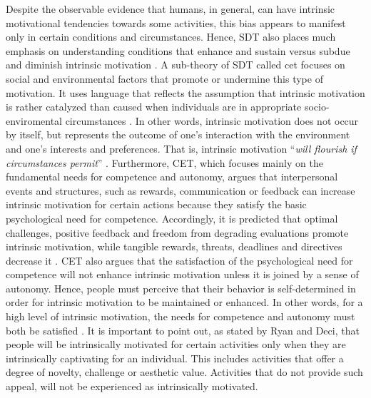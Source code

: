 Despite the observable evidence that humans, in general, can have intrinsic motivational tendencies towards some activities, this bias appears to manifest only in certain conditions and circumstances. Hence, SDT also places much emphasis on understanding conditions that enhance and sustain versus subdue and diminish intrinsic motivation \cite{ryan2000intrinsic}. A sub-theory of SDT called \acrfull{cet} focuses on social and environmental factors that promote or undermine this type of motivation. It uses language that reflects the assumption that intrinsic motivation is rather catalyzed than caused when individuals are in appropriate socio-enviromental circumstances \cite{ryan2000intrinsic, ryan2000self}. In other words, intrinsic motivation does not occur by itself, but represents the outcome of one's interaction with the environment and one's interests and preferences. That is, intrinsic motivation ``\textit{will flourish if circumstances permit}'' \cite{ryan2000self}. Furthermore, CET, which focuses mainly on the fundamental needs for competence and autonomy, argues that interpersonal events and structures, such as rewards, communication or feedback can increase intrinsic motivation for certain actions because they satisfy the basic psychological need for competence. Accordingly, it is predicted that optimal challenges, positive feedback and freedom from degrading evaluations promote intrinsic motivation, while tangible rewards, threats, deadlines  and  directives decrease it \cite{ryan2000self}. CET also argues that the satisfaction of the psychological need for competence will not enhance intrinsic motivation unless it is joined by a sense of autonomy. Hence, people must perceive that their behavior is self-determined in order for intrinsic motivation to be maintained or enhanced. In other words, for a high level of intrinsic motivation, the needs for competence and autonomy must both be satisfied \cite{ryan2000self}. It is important to point out, as stated by Ryan and Deci, that people will be intrinsically motivated for certain activities only when they are intrinsically captivating for an individual. This includes activities that offer a degree of novelty, challenge or aesthetic value. Activities that do not provide such appeal, will not be experienced as intrinsically motivated. \\
